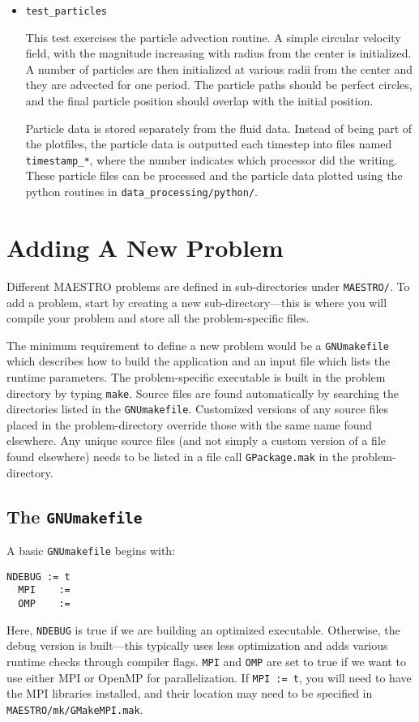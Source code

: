 \begin{itemize}
\item {\tt test\_particles}

  This test exercises the particle advection routine.  A simple
  circular velocity field, with the magnitude increasing with radius
  from the center is initialized.  A number of particles are then
  initialized at various radii from the center and they are advected
  for one period.  The particle paths should be perfect circles, and
  the final particle position should overlap with the initial
  position.

  Particle data is stored separately from the fluid data.  Instead
  of being part of the plotfiles, the particle data is outputted
  each timestep into files named {\tt timestamp\_*}, where 
  the number indicates which processor did the writing.  These
  particle files can be processed and the particle data plotted
  using the python routines in {\tt data\_processing/python/}.

\end{itemize}


\section{Adding A New Problem}
\label{sec:adding_problems}

Different MAESTRO problems are defined in sub-directories under
{\tt MAESTRO/}.  To add a problem, start by creating a new
sub-directory---this is where you will compile your problem and
store all the problem-specific files.

The minimum requirement to
define a new problem would be a {\tt GNUmakefile} which describes how
to build the application and an input file which lists the runtime
parameters.  The problem-specific executable is built in the problem
directory by typing {\tt make}.  Source files are found automatically
by searching the directories listed in the {\tt GNUmakefile}.
Customized versions of any source files placed in the problem-directory
override those with the same name found elsewhere.  Any unique
source files (and not simply a custom version of a file found
elsewhere) needs to be listed in a file call {\tt GPackage.mak}
in the problem-directory.

\subsection{The {\tt GNUmakefile}}

\label{sec:makefile}

A basic {\tt GNUmakefile} begins with:
\begin{lstlisting}[language={[gnu]make},mathescape=false]
  NDEBUG := t
  MPI    :=
  OMP    :=
\end{lstlisting}
Here, {\tt NDEBUG} is true if we are building an optimized executable.
Otherwise, the debug version is built---this typically uses less
optimization and adds various runtime checks through compiler flags.
{\tt MPI} and {\tt OMP} are set to true if we want to use either MPI
or OpenMP for parallelization.  If {\tt MPI := t}, you will need to
have the MPI libraries installed, and their location may need to be 
specified in {\tt MAESTRO/mk/GMakeMPI.mak}.

